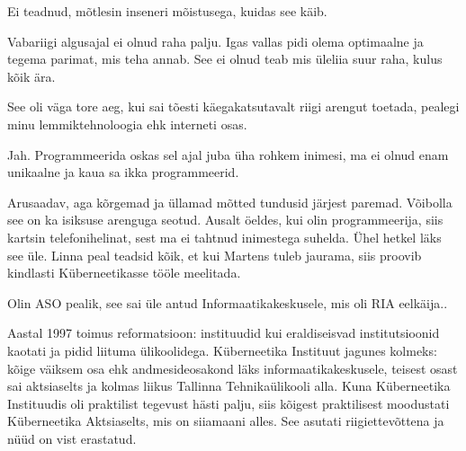 
Ei teadnud, mõtlesin inseneri mõistusega, kuidas see käib. 


Vabariigi algusajal ei olnud raha palju. Igas vallas pidi olema optimaalne ja tegema parimat, mis teha 
annab. See ei olnud teab mis üleliia suur raha, kulus kõik ära. 

See oli väga tore aeg, kui sai tõesti käegakatsutavalt riigi arengut 
toetada, pealegi minu lemmiktehnoloogia ehk 
interneti osas. 


Jah. Programmeerida oskas sel ajal juba üha rohkem inimesi, ma ei olnud enam 
unikaalne ja kaua sa ikka programmeerid.


Arusaadav, aga kõrgemad ja üllamad mõtted tundusid 
järjest paremad. Võibolla see on ka isiksuse arenguga seotud. Ausalt öeldes, 
kui olin programmeerija, siis kartsin telefonihelinat, sest ma ei 
tahtnud inimestega suhelda. Ühel hetkel läks see üle. Linna peal teadsid kõik, et kui Martens tuleb jaurama, siis 
proovib kindlasti Küberneetikasse tööle meelitada. 


Olin ASO pealik, see sai üle antud 
Informaatikakeskusele, mis oli RIA eelkäija.. 

Aastal 1997 toimus reformatsioon: instituudid kui eraldiseisvad institutsioonid 
kaotati ja pidid liituma ülikoolidega. Küberneetika Instituut jagunes kolmeks: kõige väiksem osa ehk 
andmesideosakond läks informaatikakeskusele, teisest osast sai aktsiaselts ja kolmas liikus
Tallinna Tehnikaülikooli alla. Kuna Küberneetika Instituudis oli 
praktilist tegevust hästi palju, siis kõigest praktilisest moodustati 
Küberneetika Aktsiaselts, mis on siiamaani alles. See 
asutati riigiettevõttena ja nüüd on vist erastatud. 

